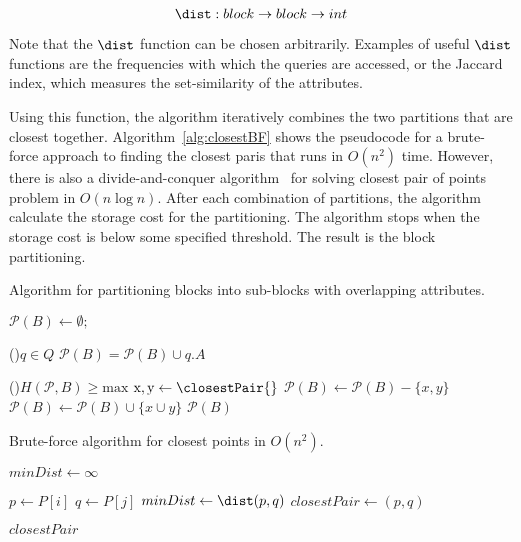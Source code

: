 $$
\dist: block \rightarrow block \rightarrow int
$$

Note that the $\dist$ function can be chosen arbitrarily.  Examples of useful
$\dist$ functions are the frequencies with which the queries are accessed, or the Jaccard index, which measures the set-similarity of
the attributes.

Using this function, the algorithm iteratively combines the two partitions that
are closest together. Algorithm~\ref{alg:closestBF} shows the pseudocode for a brute-force approach
  to finding the closest paris that runs in $O(n^2)$ time. However, there is
  also a divide-and-conquer algorithm~\cite{cormen01} for solving closest pair
  of points problem in $O(n \log n)$.
After each combination of partitions, the algorithm calculate the storage cost
for the partitioning. The algorithm stops when the  storage cost is below some
specified threshold.  The result is the block partitioning.



\begin{algorithm}[ht]
\scriptsize
\caption{Algorithm for partitioning blocks into sub-blocks with overlapping attributes.}
\label{alg:closestPair}
$\mathcal{P}(B) \leftarrow \emptyset;$  

\For(){$q \in Q$}{ 
 $\mathcal{P}(B) = \mathcal{P}(B) \cup q.A$ 
}

\While(){$H(\mathcal{P}, B) \geq
  \text{max}$}{
$\text{x}, \text{y}  \leftarrow  \closestPair{}  $\;
 $ \mathcal{P}(B)  \leftarrow \mathcal{P}(B) - \{x, y\}$ \;
  $\mathcal{P}(B)  \leftarrow \mathcal{P}(B)  \cup \{ x \cup y \}$ \;
}
\Return $ \mathcal{P}(B)$  
\end{algorithm} 



 \begin{algorithm}[ht]
 \scriptsize
 \caption{Brute-force algorithm for closest points in $O(n^2)$.}
 \label{alg:closestBF}
$minDist  \gets \infty $ \;
 {
 {

  $p \gets P[i]$ \;
  $q \gets P[j]$ \;
   {
    $minDist \gets \dist(p,q)$\;
    $closestPair \gets (p,q)$\;
  }
}
}
\Return $closestPair$
 \end{algorithm} 